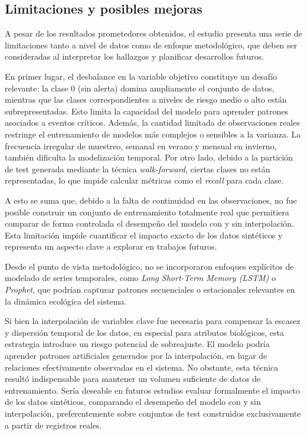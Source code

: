 \documentclass[11pt]{report}
\begin{document}
\subsection{Limitaciones y posibles mejoras}

A pesar de los resultados prometedores obtenidos, el estudio presenta una serie de limitaciones tanto a nivel de datos como de enfoque metodológico, que deben ser consideradas al interpretar los hallazgos y planificar desarrollos futuros.

En primer lugar, el desbalance en la variable objetivo constituye un desafío relevante: la clase 0 (sin alerta) domina ampliamente el conjunto de datos, mientras que las clases correspondientes a niveles de riesgo medio o alto están subrepresentadas. Esto limita la capacidad del modelo para aprender patrones asociados a eventos críticos. Además, la cantidad limitada de observaciones reales restringe el entrenamiento de modelos más complejos o sensibles a la varianza. La frecuencia irregular de muestreo, semanal en verano y mensual en invierno, también dificulta la modelización temporal. Por otro lado, debido a la partición de test generada mediante la técnica \textit{walk-forward}, ciertas clases no están representadas, lo que impide calcular métricas como el \textit{recall} para cada clase.


A esto se suma que, debido a la falta de continuidad en las observaciones, no fue posible construir un conjunto de entrenamiento totalmente real que permitiera comparar de forma controlada el desempeño del modelo con y sin interpolación. Esta limitación impide cuantificar el impacto exacto de los datos sintéticos y representa un aspecto clave a explorar en trabajos futuros.

Desde el punto de vista metodológico, no se incorporaron enfoques explícitos de modelado de series temporales, como \textit{Long Short-Term Memory (LSTM)} o \textit{Prophet}, que podrían capturar patrones secuenciales o estacionales relevantes en la dinámica ecológica del sistema.

Si bien la interpolación de variables clave fue necesaria para compensar la escasez y dispersión temporal de los datos, en especial para atributos biológicos, esta estrategia introduce un riesgo potencial de sobreajuste. El modelo podría aprender patrones artificiales generados por la interpolación, en lugar de relaciones efectivamente observadas en el sistema. No obstante, esta técnica resultó indispensable para mantener un volumen suficiente de datos de entrenamiento. Sería deseable en futuros estudios evaluar formalmente el impacto de los datos sintéticos, comparando el desempeño del modelo con y sin interpolación, preferentemente sobre conjuntos de test construidos exclusivamente a partir de registros reales.
\end{document}
